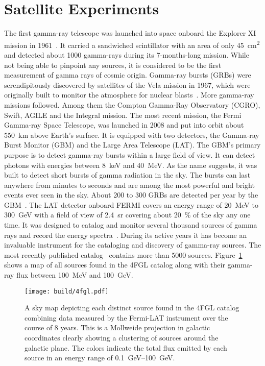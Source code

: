 \section{Satellite Experiments}
The first gamma-ray telescope was launched into space onboard the Explorer XI mission in 1961~\cite{explorer}.
It carried a sandwiched scintillator with an area of only \SI{45}{cm^2} and detected about
\num{1000} gamma-rays during its 7-months-long mission. While not being able to pinpoint any sources, it is considered to
be the first measurement of gamma rays of cosmic origin. Gamma-ray bursts (GRBs) were serendipitously
discovered by satellites of the Vela mission in 1967, which were originally built to monitor the atmosphere for nuclear blasts~\cite{vela}.
More gamma-ray missions followed. Among them the Compton Gamma-Ray Observatory (CGRO), Swift, AGILE and the Integral mission. %
The most recent mission, the Fermi Gamma-ray Space Telescope, was launched in 2008 and put into orbit about \SI{550}{km} above Earth's surface.
It is equipped with two detectors, the Gamma-ray Burst Monitor (GBM) and the Large Area Telescope (LAT).
The GBM's primary purpose is to detect gamma-ray bursts within a large field of view. It can detect photons
with energies between \SI{8}{keV} and \SI{40}{MeV}. As the name suggests, it was built to detect short bursts
of gamma radiation in the sky. The bursts can last anywhere from minutes to seconds and are among the most powerful and bright events
ever seen in the sky. About 200 to 300 GRBs are detected per year by the GBM~\cite{fermi_gbm}.
The LAT detector onboard FERMI covers an energy range of \SI{20}{MeV} to \SI{300}{GeV} with a field of view of
\SI{2.4}{sr} covering about \SI{20}{\percent} of the sky any one time.
It was designed to catalog and monitor several thousand sources of gamma rays and record the energy spectra~\cite{fermi_lat}.
During its active years it has become an invaluable instrument for the cataloging and discovery of gamma-ray sources.
The most recently published catalog~\cite{4fgl} contains more than \num{5000} sources. Figure~\ref{fig:4fgl} shows a map
of all sources found in the 4FGL catalog along with their gamma-ray flux between \SI{100}{MeV} and \SI{100}{GeV}.

\begin{figure}[h]
  \centering
  \texttt{[image: build/4fgl.pdf]}
  \caption[Skymap of Fermi's 4FGL source catalog]{A sky map depicting each distinct source found in the 4FGL catalog combining data measured by the
  Fermi-LAT instrument over the course of 8 years. This is a Mollweide projection in galactic coordinates clearly showing
  a clustering of sources around the galactic plane. The colors indicate the total flux emitted by each source
  in an energy range of \SIrange{0.1}{100}{GeV}.}
  \label{fig:4fgl}
\end{figure}


